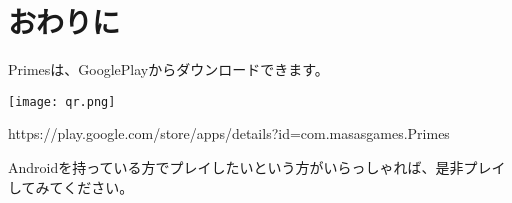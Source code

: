 \section{おわりに}
Primesは、GooglePlayからダウンロードできます。
\begin{center}
	\texttt{[image: qr.png]}
\end{center}
\begin{center}
	https://play.google.com/store/apps/details?id=com.masasgames.Primes
\end{center}

Androidを持っている方でプレイしたいという方がいらっしゃれば、是非プレイしてみてください。